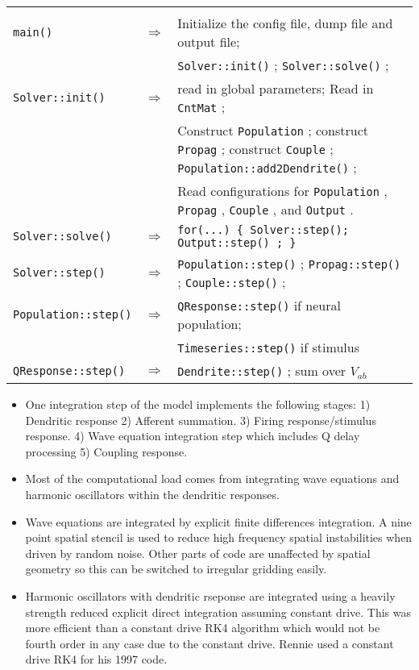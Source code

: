 \documentclass[12pt,a4paper]{article}
\newcommand{\type}[1]{ {\small\small\tt #1} }
\begin{document}
\begin{center}
\begin{tabular}{ | l l p{11cm} | }
\hline \\

\type{main()}& $\Rightarrow$ &Initialize the config file, dump file and output file;\\[6pt]
&&\type{Solver::init()};\type{Solver::solve()};\\[6pt]
\type{Solver::init()}& $\Rightarrow$ &read in global parameters; Read in \type{CntMat};\\[6pt]
&&Construct \type{Population}; construct \type{Propag}; construct \type{Couple}; \type{Population::add2Dendrite()};\\[6pt]
&&Read configurations for \type{Population}, \type{Propag}, \type{Couple}, and \type{Output}.\\[6pt]
\type{Solver::solve()}& $\Rightarrow$ & \type{for(...) \{ Solver::step(); \type{Output::step()}; \} }\\[6pt]
\type{Solver::step()}& $\Rightarrow$ & \type{Population::step()}; \type{Propag::step()}; \type{Couple::step()};\\[6pt]
\type{Population::step()}& $\Rightarrow$ & \type{QResponse::step()} if neural population;\\[6pt]
&&\type{Timeseries::step()} if stimulus\\[6pt]
\type{QResponse::step()}& $\Rightarrow$ & \type{Dendrite::step()}; sum over \(V_{ab}\)

\\\hline
\end{tabular}
\end{center}

\begin{itemize}
\item One integration step of the model implements the following stages: 1) Dendritic response 2) Afferent summation. 3) Firing response/stimulus response. 4) Wave equation integration step which includes Q delay processing 5) Coupling response.
\item Most of the computational load comes from integrating wave equations and harmonic oscillators within the dendritic responses.
\item Wave equations are integrated by explicit finite differences integration. A nine point spatial stencil is used to reduce high frequency spatial instabilities when driven by random noise. Other parts of code are unaffected by spatial geometry so this can be switched to irregular gridding easily.
\item Harmonic oscillators with dendritic rseponse are integrated using a heavily strength reduced explicit direct integration assuming constant drive. This was more efficient than a constant drive RK4 algorithm which would not be fourth order in any case due to the constant drive. Rennie used a constant drive RK4 for his 1997 code.
\end{itemize}
\end{document}
